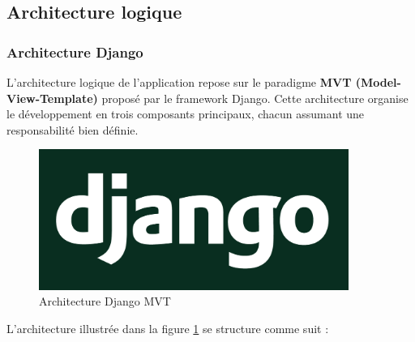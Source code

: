 \subsection{Architecture logique}
\subsubsection{Architecture Django}
L’architecture logique de l’application repose sur le paradigme \textbf{MVT (Model-View-Template)} proposé par le framework Django. Cette architecture organise le développement en trois composants principaux, chacun assumant une responsabilité bien définie.

\begin{figure}[H]
    \centering
    \includegraphics[width=0.9\textwidth]{figures/django.png}
    \caption{Architecture Django MVT}
    \label{fig:architecture_mvt}
\end{figure}

L’architecture illustrée dans la figure \ref{fig:architecture_mvt} se structure comme suit :

